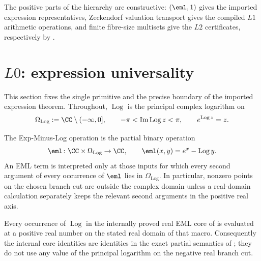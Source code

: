 The positive parts of the hierarchy are constructive: \((\eml,1)\) gives the
imported expression representatives, Zeckendorf valuation transport gives the
compiled \(L1\) arithmetic operations, and finite fibre-size multisets give the
\(L2\) certificates, respectively by
.

\section{\texorpdfstring{\(L0\)}{L0}: expression universality}\label{sec:L0}

This section fixes the single primitive and the precise boundary of the imported
expression theorem.  Throughout, \(\operatorname{Log}\) is the principal complex
logarithm on
\[
  \Omega_{\mathrm{Log}}:=\CC\setminus(-\infty,0],
  \qquad -\pi<\operatorname{Im}\operatorname{Log}z<\pi,
  \qquad e^{\operatorname{Log}z}=z .
\]

\begin{definition}\label{def:eml}
The Exp-Minus-Log operation is the partial binary operation
\[
  \eml\colon\CC\times\Omega_{\mathrm{Log}}\to\CC,
  \qquad \eml(x,y)=e^x-\operatorname{Log}y .
\]
An EML term is interpreted only at those inputs for which every second argument
of every occurrence of \(\eml\) lies in \(\Omega_{\mathrm{Log}}\).  In particular,
nonzero points on the chosen branch cut are outside the complex domain unless a
real-domain calculation separately keeps the relevant second arguments in the
positive real axis.
\end{definition}

\begin{lemma}
\label{lem:internal-core-branch-domain-safety}
Every occurrence of \(\operatorname{Log}\) in the internally proved real EML core
of  is evaluated at a
positive real number on the stated real domain of that macro.  Consequently the
internal core identities are identities in the exact partial semantics of
; they do not use any value of the principal logarithm on the
negative real branch cut.
\end{lemma}

